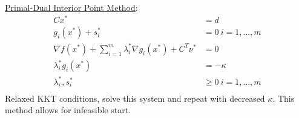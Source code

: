 \documentclass[a4paper,landscape,8pt,fleqn]{scrartcl}
\begin{document}
\begin{multicols}{3}
\begin{align*}
\end{align*}
\underline{Primal-Dual Interior Point Method}:
\begin{align*}
	C x^* &= d \\
	g_i(x^*) + s_i^* &= 0 ~ i=1,\dots,m\\
	\nabla f(x^*) + \sum_{i=1}^m \lambda_i^* \nabla g_i(x^*) + C^T \nu^* &= 0 \\
	\lambda_i^* g_i(x^*) &= -\kappa \\
	\lambda_i^*,s_i^* &\geq 0 ~ i=1,\dots,m\\
\end{align*}
Relaxed KKT conditions, solve this system and repeat with decreased $\kappa$. This method allows for infeasible start.
\end{multicols}
\end{document}
